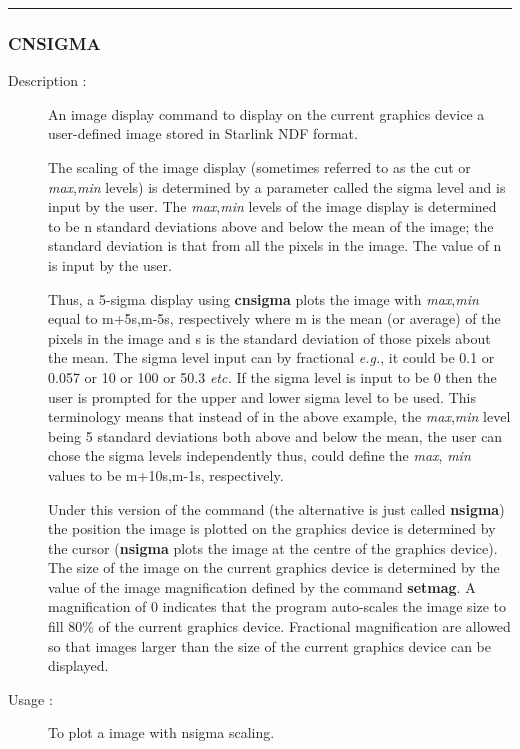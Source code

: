 \hrule 
\subsubsection*{\label{CNSIGMA}CNSIGMA}

\begin{description}

\item[Description :] An image display command to display on the current
graphics device a user-defined image stored in Starlink NDF format.

The scaling of the image display (sometimes referred to as the cut or
{\it max},{\it min} levels) is determined by a parameter called the
sigma level and is input by the user.  The {\it max},{\it min} levels
of the image display is determined to be n standard deviations above
and below the mean of the image; the standard deviation is that from
all the pixels in the image.  The value of n is input by the user.

Thus, a 5-sigma display using {\bf cnsigma} plots the image with {\it
max},{\it min} equal to m+5s,m-5s, respectively where m is the mean (or
average) of the pixels in the image and s is the standard deviation of
those pixels about the mean.  The sigma level input can by fractional
\emph{e.g.}, it could be 0.1 or 0.057 or 10 or 100 or 50.3 \emph{etc.}
If the sigma level is input to be 0 then the user is prompted for the
upper and lower sigma level to be used. This terminology means that
instead of in the above example, the {\it max},{\it min} level being 5
standard deviations both above and below the mean, the user can chose
the sigma levels independently thus, could define the {\it max},{\it
min} values to be m+10s,m-1s, respectively.

Under this version of the command (the alternative is just called {\bf
nsigma}) the position the image is plotted on the graphics device is
determined by the cursor ({\bf nsigma} plots the image at the centre of
the graphics device).  The size of the image on the current graphics
device is determined by the value of the image magnification defined by
the command {\bf setmag}.  A magnification of 0 indicates that the
program auto-scales the image size to fill 80\% of the current graphics
device.  Fractional magnification are allowed so that images larger
than the size of the current graphics device can be displayed.

\item[Usage :] To plot a image with nsigma scaling.


\end{description}
